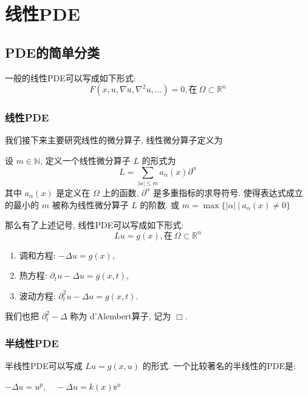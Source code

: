 \documentclass[11pt]{ctexart}[UTF8]
\begin{document}
\newpage
\section{线性PDE}
\subsection{PDE的简单分类}
一般的线性PDE可以写成如下形式:
\begin{equation*}
    F(x, u, \nabla u, \nabla^2 u, \ldots) = 0, \text{在}\  \Omega \subset \mathbb{R}^n
\end{equation*}
\subsubsection*{线性PDE}
我们接下来主要研究线性的微分算子, 线性微分算子定义为
\begin{definition}[线性微分算子]
    设 $m \in \mathbb{N}$, 定义一个线性微分算子 $L$ 的形式为
\begin{equation*}
    L = \sum\limits_{|\alpha| \leq m} a_{\alpha}(x) \partial^{\alpha}
\end{equation*}
其中 $a_{\alpha}(x)$ 是定义在 $\Omega$ 上的函数, $\partial^{\alpha}$ 是多重指标的求导符号. 使得表达式成立的最小的 $m$ 被称为线性微分算子 $L$ 的阶数.
或 $m = \max\{|\alpha| \  |\ a_{\alpha}(x) \neq 0\}$
\end{definition}
那么有了上述记号, 线性PDE可以写成如下形式:
\begin{equation*}
    Lu = g(x), \text{在}\  \Omega \subset \mathbb{R}^n
\end{equation*}
\begin{example}
    \begin{enumerate}
        \item 调和方程: $-\Delta u = g(x)$,
        \item 热方程: $\partial_t u - \Delta u = g(x, t)$,
        \item 波动方程: $\partial_t^2 u - \Delta u = g(x, t)$.
    \end{enumerate}
\end{example}
\begin{remark}
    我们也把 $\partial_{t}^2-\Delta$ 称为 d'Alembert算子, 记为 $\Box$.
\end{remark}
\subsubsection*{半线性PDE}
半线性PDE可以写成 $Lu = g(x,u)$ 的形式. 一个比较著名的半线性的PDE是:
\begin{example}
    $-\Delta u = u^p,\quad -\Delta u = k(x)\mathbb{e}^{u}$
\end{example}
\end{document}
